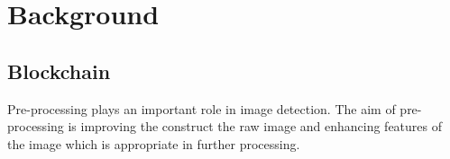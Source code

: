 \chapter{Background} \label{background}

\section{Blockchain}
Pre-processing plays an important role in image detection. The aim of pre-processing is improving the construct the raw image and enhancing features of the image which is appropriate in further processing.


